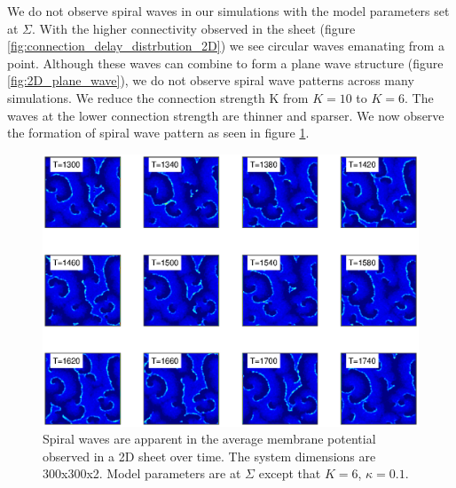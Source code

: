 We do not observe spiral waves in our simulations with the model parameters set at $\Sigma$.
With the higher connectivity observed in the sheet (figure \ref{fig:connection_delay_distrbution_2D}) we see circular waves emanating from a point.
Although these waves can combine to form a plane wave structure (figure \ref{fig:2D_plane_wave}), we do not observe spiral wave patterns across many simulations.
We reduce the connection strength K from $K=10$ to $K=6$.
The waves at the lower connection strength are thinner and sparser.
We now observe the formation of spiral wave pattern as seen in figure \ref{fig:2DSpiralWaves}.
\begin{figure}[!htb]
 \caption{ Spiral waves are apparent in the average membrane potential observed in a 2D sheet over time. 
           The system dimensions are 300x300x2. Model parameters are at $\Sigma$ except that $K=6$, $\kappa=0.1$.
           }
 \label{fig:2DSpiralWaves}
 \centering
   \includegraphics[width=\textwidth]{fig/SpiralWaves2D_K6_kappa0p1_M4}
\end{figure}
\FloatBarrier


